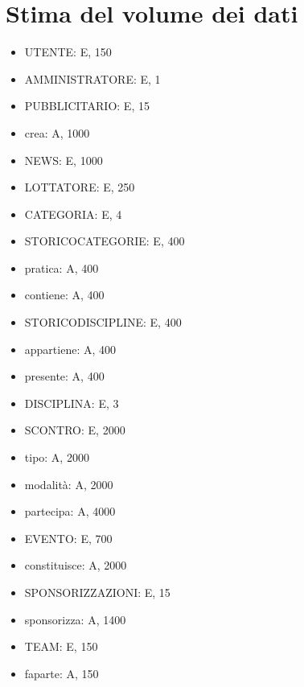 \documentclass[a4paper,12pt]{report}
\begin{document}
\section{Stima del volume dei dati}
\begin{itemize}
    \item UTENTE: E, 150
    \item AMMINISTRATORE: E, 1
    \item PUBBLICITARIO: E, 15
    \item crea: A, 1000
    \item NEWS: E, 1000
    \item LOTTATORE: E, 250
    \item CATEGORIA: E, 4
    \item STORICO\textunderscore CATEGORIE: E, 400
    \item pratica: A, 400
    \item contiene: A, 400
    \item STORICO\textunderscore DISCIPLINE: E, 400
    \item appartiene: A, 400
    \item presente: A, 400
    \item DISCIPLINA: E, 3
    \item SCONTRO: E, 2000
    \item tipo: A, 2000
    \item modalità: A, 2000
    \item partecipa: A, 4000
    \item EVENTO: E, 700
    \item constituisce: A, 2000
    \item SPONSORIZZAZIONI: E, 15
    \item sponsorizza: A, 1400
    \item TEAM: E, 150
    \item fa\textunderscore parte: A, 150
\end{itemize}
\end{document}
